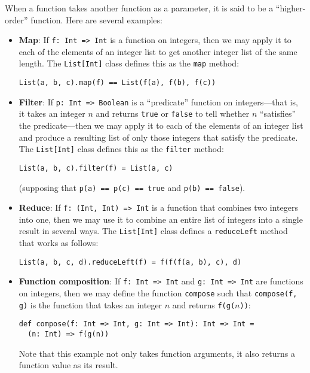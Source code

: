 When a function takes another function as a parameter, it is said to be a ``higher-order'' function. Here are several examples:
\begin{itemize}
\item \textbf{Map}: If \verb|f: Int => Int| is a function on integers, then we may apply it to each of the elements of an integer list to get another integer list of the same length. The \verb|List[Int]| class defines this as the \verb|map| method:
\begin{verbatim}
List(a, b, c).map(f) == List(f(a), f(b), f(c))
\end{verbatim}

\item \textbf{Filter}: If \verb|p: Int => Boolean| is a ``predicate'' function on integers---that is, it takes an integer $n$ and returns \verb|true| or \verb|false| to tell whether $n$ ``satisfies'' the predicate---then we may apply it to each of the elements of an integer list and produce a resulting list of only those integers that satisfy the predicate. The \verb|List[Int]| class defines this as the \verb|filter| method:
\begin{verbatim}
List(a, b, c).filter(f) = List(a, c)
\end{verbatim}
(supposing that \verb|p(a) == p(c) == true| and \verb|p(b) == false|).

\item \textbf{Reduce}: If \verb|f: (Int, Int) => Int| is a function that combines two integers into one, then we may use it to combine an entire list of integers into a single result in several ways. The \verb|List[Int]| class defines a \verb|reduceLeft| method that works as follows:
\begin{verbatim}
List(a, b, c, d).reduceLeft(f) = f(f(f(a, b), c), d)
\end{verbatim}

\item \textbf{Function composition}: If \verb|f: Int => Int| and \verb|g: Int => Int| are functions on integers, then we may define the function \verb|compose| such that \verb|compose(f, g)| is the function that takes an integer $n$ and returns \texttt{f(g($n$))}:
\begin{verbatim}
def compose(f: Int => Int, g: Int => Int): Int => Int =
  (n: Int) => f(g(n))
\end{verbatim}
Note that this example not only takes function arguments, it also returns a function value as its result.


\end{itemize}
